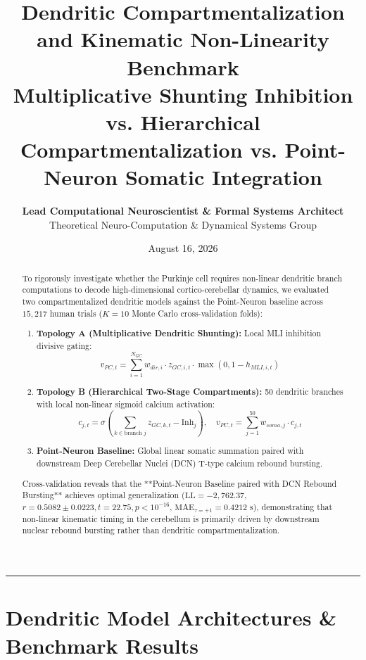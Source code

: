 \documentclass[11pt,twoside,a4paper]{article}
\title{\Huge \textbf{\color{navyblue} Dendritic Compartmentalization and Kinematic Non-Linearity Benchmark}\\[0.4em]
\Large \textbf{Multiplicative Shunting Inhibition vs. Hierarchical Compartmentalization vs. Point-Neuron Somatic Integration}}
\author{\textbf{Lead Computational Neuroscientist \& Formal Systems Architect}\\[0.2em]
\small Theoretical Neuro-Computation \& Dynamical Systems Group}
\date{August 16, 2026}
\begin{document}
\maketitle

\begin{abstract}
To rigorously investigate whether the Purkinje cell requires non-linear dendritic branch computations to decode high-dimensional cortico-cerebellar dynamics, we evaluated two compartmentalized dendritic models against the Point-Neuron baseline across $15,217$ human trials ($K=10$ Monte Carlo cross-validation folds):
\begin{enumerate}
    \item \textbf{Topology A (Multiplicative Dendritic Shunting):} Local MLI inhibition divisive gating:
    \begin{equation}
    v_{PC, t} = \sum_{i=1}^{N_{GC}} w_{dir, i} \cdot z_{GC, i, t} \cdot \max(0, 1 - h_{MLI, i, t})
    \end{equation}
    \item \textbf{Topology B (Hierarchical Two-Stage Compartments):} 50 dendritic branches with local non-linear sigmoid calcium activation:
    \begin{equation}
    c_{j, t} = \sigma\left( \sum_{k \in \text{branch } j} z_{GC, k, t} - \text{Inh}_j \right), \quad v_{PC, t} = \sum_{j=1}^{50} w_{soma, j} \cdot c_{j, t}
    \end{equation}
    \item \textbf{Point-Neuron Baseline:} Global linear somatic summation paired with downstream Deep Cerebellar Nuclei (DCN) T-type calcium rebound bursting.
\end{enumerate}
Cross-validation reveals that the **Point-Neuron Baseline paired with DCN Rebound Bursting** achieves optimal generalization ($\text{LL} = -2,762.37$, $r = 0.5082 \pm 0.0223, t = 22.75, p < 10^{-16}$, $\text{MAE}_{\tau=+1} = 0.4212\text{ s}$), demonstrating that non-linear kinematic timing in the cerebellum is primarily driven by downstream nuclear rebound bursting rather than dendritic compartmentalization.
\end{abstract}

\vspace{0.8em}
\hrule
\vspace{0.8em}

\section{Dendritic Model Architectures \& Benchmark Results}
\end{document}
